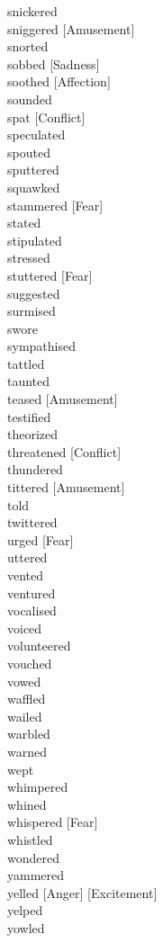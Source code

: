 snickered \hfill \\
sniggered [Amusement] \hfill \\
snorted \hfill \\
sobbed [Sadness] \hfill \\
soothed [Affection] \hfill \\
sounded \hfill \\
spat [Conflict] \hfill \\
speculated \hfill \\
spouted \hfill \\
sputtered \hfill \\
squawked \hfill \\
stammered [Fear] \hfill \\
stated \hfill \\
stipulated \hfill \\
stressed \hfill \\
stuttered [Fear] \hfill \\
suggested \hfill \\
surmised \hfill \\
swore \hfill \\
sympathised \hfill \\
tattled \hfill \\
taunted \hfill \\
teased [Amusement] \hfill \\
testified \hfill \\
theorized \hfill \\
threatened [Conflict] \hfill \\
thundered \hfill \\
tittered [Amusement] \hfill \\
told \hfill \\
twittered \hfill \\
urged [Fear] \hfill \\
uttered \hfill \\
vented \hfill \\
ventured \hfill \\
vocalised \hfill \\
voiced \hfill \\
volunteered \hfill \\
vouched \hfill \\
vowed \hfill \\
waffled \hfill \\
wailed \hfill \\
warbled \hfill \\
warned \hfill \\
wept \hfill \\
whimpered \hfill \\
whined \hfill \\
whispered [Fear] \hfill \\
whistled \hfill \\
wondered \hfill \\
yammered \hfill \\
yelled [Anger] [Excitement] \hfill \\
yelped \hfill \\
yowled \hfill \\

